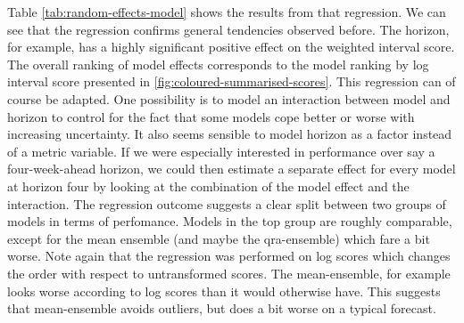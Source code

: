 \documentclass[
]{book}
\begin{document}
Table \ref{tab:random-effects-model} shows the results from that regression. We can see that the regression confirms general tendencies observed before. The horizon, for example, has a highly significant positive effect on the weighted interval score. The overall ranking of model effects corresponds to the model ranking by log interval score presented in \ref{fig:coloured-summarised-scores}. This regression can of course be adapted. One possibility is to model an interaction between model and horizon to control for the fact that some models cope better or worse with increasing uncertainty. It also seems sensible to model horizon as a factor instead of a metric variable. If we were especially interested in performance over say a four-week-ahead horizon, we could then estimate a separate effect for every model at horizon four by looking at the combination of the model effect and the interaction. The regression outcome suggests a clear split between two groups of models in terms of perfomance. Models in the top group are roughly comparable, except for the mean ensemble (and maybe the qra-ensemble) which fare a bit worse. Note again that the regression was performed on log scores which changes the order with respect to untransformed scores. The mean-ensemble, for example looks worse according to log scores than it would otherwise have. This suggests that mean-ensemble avoids outliers, but does a bit worse on a typical forecast.
\end{document}
